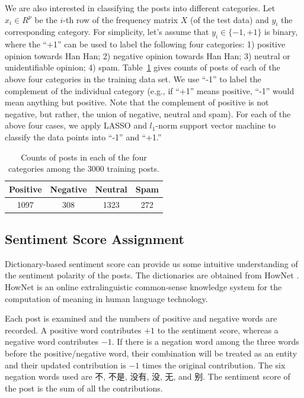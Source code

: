 \documentclass[11pt]{article}
\newcommand{\1}[1]{{\mathbf 1}\left\{#1\right\}}        %
\begin{document}
We are also interested in classifying the posts into different categories. Let $x_i\in R^{p}$ be the $i$-th row of the frequency matrix $X$ (of the test data) and $y_i$ the corresponding category. For simplicity, let's assume that $y_i\in\{-1,+1\}$ is binary, where the ``+1'' can be used to label the following four categories: 1) positive opinion towards Han Han; 2) negative opinion towards Han Han; 3) neutral or unidentifiable opinion; 4) spam. Table~\ref{tb:traincounts} gives counts of posts of each of the above four categories in the training data set. We use ``-1'' to label the complement of the individual category (e.g., if ``+1'' means positive, ``-1'' would mean anything but positive. Note that the complement of positive is not negative, but rather, the union of negative, neutral and spam). For each of the above four cases, we apply LASSO and $l_1$-norm support vector machine to classify the data points into ``-1'' and ``+1.''

\begin{table}[!h]
\caption{Counts of posts in each of the four categories among the 3000 training posts.}
\begin{center}
\begin{tabular}{|c|c|c|c|}
\hline
Positive & Negative & Neutral & Spam \\ \hline
 1097      & 308   &   1323   &  272 \\ \hline
\end{tabular}
\end{center}
\label{tb:traincounts}
\end{table}%

\subsection{Sentiment Score Assignment}\label{subsec:senscore}
Dictionary-based sentiment score can provide us some intuitive understanding of the sentiment polarity of the posts. 
The dictionaries are obtained from HowNet \cite{HowNet}. HowNet is an online extralinguistic common-sense knowledge system for the computation of meaning in human language technology.


Each post is examined and the numbers of positive and negative words are recorded. A positive word contributes $+1$ to the sentiment score, whereas a negative word contributes $-1$. If there is a negation word among the three words before the positive/negative word, their combination will be treated as an entity and their updated contribution is $-1$ times the original contribution. The six negation words used are 不, 不是, 没有, 没, 无, and 别. The sentiment score of the post is the sum of all the contributions. 
\end{document}
